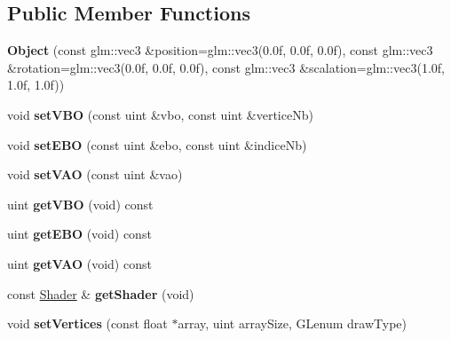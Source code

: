 \subsection*{Public Member Functions}
\begin{DoxyCompactItemize}
\item 
\mbox{\label{class_object_a762153e3524db0b2eb74dbe71a346320}} 
{\bfseries Object} (const glm\+::vec3 \&position=glm\+::vec3(0.\+0f, 0.\+0f, 0.\+0f), const glm\+::vec3 \&rotation=glm\+::vec3(0.\+0f, 0.\+0f, 0.\+0f), const glm\+::vec3 \&scalation=glm\+::vec3(1.\+0f, 1.\+0f, 1.\+0f))
\item 
\mbox{\label{class_object_accca66b4eaf6fabfcc30335b5b61c2b0}} 
void {\bfseries set\+V\+BO} (const uint \&vbo, const uint \&vertice\+Nb)
\item 
\mbox{\label{class_object_a146f845664b3c1597fc38f9ec96e213a}} 
void {\bfseries set\+E\+BO} (const uint \&ebo, const uint \&indice\+Nb)
\item 
\mbox{\label{class_object_a9fdaca6f7c488ab33ac13e87bd592c73}} 
void {\bfseries set\+V\+AO} (const uint \&vao)
\item 
\mbox{\label{class_object_a8fd0f444323745a0e2ac7d93a5bfebd8}} 
uint {\bfseries get\+V\+BO} (void) const
\item 
\mbox{\label{class_object_aac91fcf10fe0becb8951b135c93c566a}} 
uint {\bfseries get\+E\+BO} (void) const
\item 
\mbox{\label{class_object_abb81a00502ed4444ac27bb3851bfee8a}} 
uint {\bfseries get\+V\+AO} (void) const
\item 
\mbox{\label{class_object_ab0bb4f22fd1dbf20a2ae8c6755b683a3}} 
const \hyperlink{class_shader}{Shader} \& {\bfseries get\+Shader} (void)
\item 
\mbox{\label{class_object_a6af4ee5d88817a5d136a64c6b1601a18}} 
void {\bfseries set\+Vertices} (const float $\ast$array, uint array\+Size, G\+Lenum draw\+Type)
\item 
\mbox{\label{class_object_a57a89e83099e91a5e33316dfdc37bd95}} 

\end{DoxyCompactItemize}
